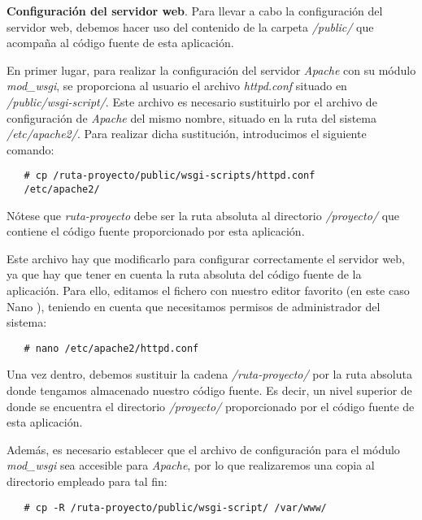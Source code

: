 \item \textbf{Configuración del servidor web}.
   Para llevar a cabo la configuración del servidor web, debemos hacer uso del
   contenido de la carpeta \textit{/public/} que acompaña al código fuente de
   esta aplicación.

   En primer lugar, para realizar la configuración del servidor \textit{Apache}
   con su módulo \textit{mod\_wsgi}, se proporciona al usuario el archivo
   \textit{httpd.conf} situado en \textit{/public/wsgi-script/}. Este archivo
   es necesario sustituirlo por el archivo de configuración de \textit{Apache}
   del mismo nombre, situado en la ruta del sistema \textit{/etc/apache2/}. Para
   realizar dicha sustitución, introducimos el siguiente comando:

   \begin{verbatim}
   # cp /ruta-proyecto/public/wsgi-scripts/httpd.conf
   /etc/apache2/
   \end{verbatim}

   Nótese que \textit{ruta-proyecto} debe ser la ruta absoluta al directorio
   \textit{/proyecto/} que contiene el código fuente proporcionado por esta
   aplicación.

   Este archivo hay que modificarlo para configurar correctamente el servidor
   web, ya que hay que tener en cuenta la ruta absoluta del código fuente de
   la aplicación. Para ello, editamos el fichero con nuestro editor favorito
   (en este caso Nano \cite{nano}), teniendo en cuenta que necesitamos
   permisos de administrador del sistema:

   \begin{verbatim}
   # nano /etc/apache2/httpd.conf
   \end{verbatim}

   Una vez dentro, debemos sustituir la cadena \textit{/ruta-proyecto/} por
   la ruta absoluta donde tengamos almacenado nuestro código fuente. Es decir,
   un nivel superior de donde se encuentra el directorio \textit{/proyecto/}
   proporcionado por el código fuente de esta aplicación.

   Además, es necesario establecer que el archivo de configuración para el
   módulo \textit{mod\_wsgi} sea accesible para \textit{Apache}, por lo que
   realizaremos una copia al directorio empleado para tal fin:

   \begin{verbatim}
   # cp -R /ruta-proyecto/public/wsgi-script/ /var/www/
   \end{verbatim}

